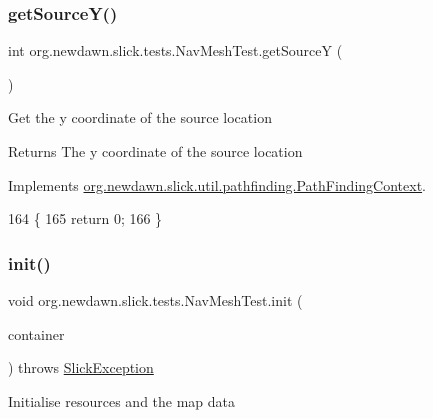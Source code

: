 \subsubsection{\texorpdfstring{get\+Source\+Y()}{getSourceY()}}
{\footnotesize\ttfamily int org.\+newdawn.\+slick.\+tests.\+Nav\+Mesh\+Test.\+get\+SourceY (\begin{DoxyParamCaption}{ }\end{DoxyParamCaption})\hspace{0.3cm}{\ttfamily [inline]}}

Get the y coordinate of the source location

\begin{DoxyReturn}{Returns}
The y coordinate of the source location 
\end{DoxyReturn}


Implements \mbox{\hyperlink{interfaceorg_1_1newdawn_1_1slick_1_1util_1_1pathfinding_1_1_path_finding_context_a30ac68532d0f3e9e5f4ce5e5e88f593e}{org.\+newdawn.\+slick.\+util.\+pathfinding.\+Path\+Finding\+Context}}.


\begin{DoxyCode}
164                             \{
165         \textcolor{keywordflow}{return} 0;
166     \}
\end{DoxyCode}
\mbox{\label{classorg_1_1newdawn_1_1slick_1_1tests_1_1_nav_mesh_test_a5cc5ff5d79dbd5f96dd04f38ad8259e7}} 
\subsubsection{\texorpdfstring{init()}{init()}}
{\footnotesize\ttfamily void org.\+newdawn.\+slick.\+tests.\+Nav\+Mesh\+Test.\+init (\begin{DoxyParamCaption}\item[{\mbox{\hyperlink{classorg_1_1newdawn_1_1slick_1_1_game_container}{Game\+Container}}}]{container }\end{DoxyParamCaption}) throws \mbox{\hyperlink{classorg_1_1newdawn_1_1slick_1_1_slick_exception}{Slick\+Exception}}\hspace{0.3cm}{\ttfamily [inline]}}

Initialise resources and the map data


